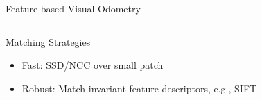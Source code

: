 \documentclass[10pt]{beamer}
\newcommand{\mycite}[1]{ {\color{gray} \citep{#1}} }
\begin{document}
\begin{frame}{Feature-based Visual Odometry}
\begin{columns}
\begin{column}{0.6\textwidth}
	  \end{column}
	\end{columns}
	\begin{columns}
		\begin{column}{0.6\textwidth}
			\begin{block}{Matching Strategies}
				\begin{itemize}
					\item Fast: SSD/NCC over small patch
					\item Robust: Match invariant feature descriptors, e.g., SIFT \mycite{Lowe2003SIFT}
				\end{itemize}
			\end{block}
		\end{column}
		\begin{column}{0.4\textwidth}
		\end{column}
	\end{columns}
\end{frame}
\end{document}
